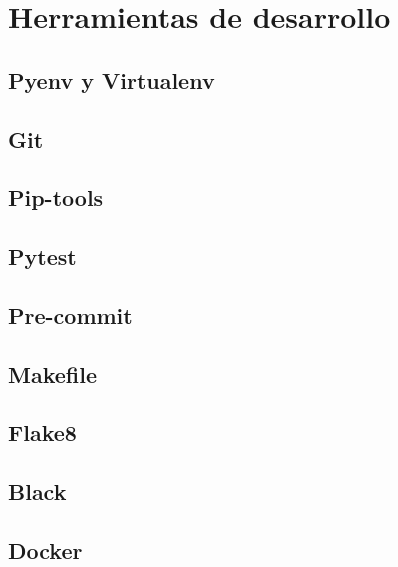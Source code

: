 \section{Herramientas de desarrollo}

    \subsection{Pyenv y Virtualenv}

    \subsection{Git}

    \subsection{Pip-tools}

    \subsection{Pytest}
    
    \subsection{Pre-commit}

    \subsection{Makefile}

    \subsection{Flake8}

    \subsection{Black}
    
    \subsection{Docker}
    

\pagebreak